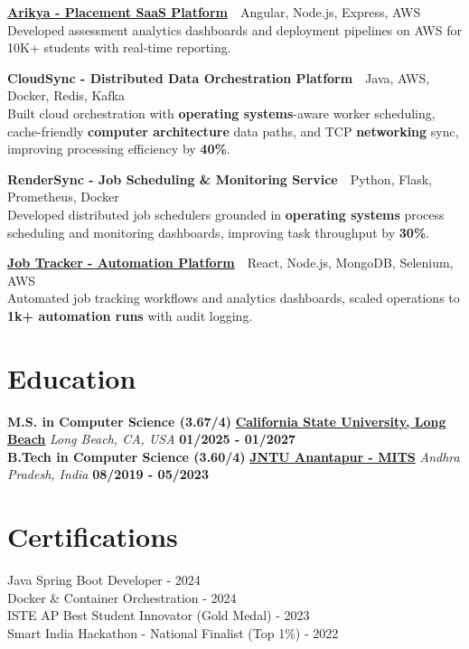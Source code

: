 \documentclass[letterpaper,11pt]{article}
\begin{document}
\vspace{2pt}
\href{https://arikya.in}{\textbf{Arikya - Placement SaaS Platform}} \,\textbar\, {Angular, Node.js, Express, AWS}\\
Developed assessment analytics dashboards and deployment pipelines on AWS for 10K+ students with real-time reporting.

\vspace{2pt}
\textbf{CloudSync - Distributed Data Orchestration Platform} \,\textbar\, {Java, AWS, Docker, Redis, Kafka}\\
Built cloud orchestration with \textbf{operating systems}-aware worker scheduling, cache-friendly \textbf{computer architecture} data paths, and TCP \textbf{networking} sync, improving processing efficiency by \textbf{40\%}.

\vspace{2pt}
\textbf{RenderSync - Job Scheduling \& Monitoring Service} \,\textbar\, {Python, Flask, Prometheus, Docker}\\
Developed distributed job schedulers grounded in \textbf{operating systems} process scheduling and monitoring dashboards, improving task throughput by \textbf{30\%}.

\vspace{2pt}
\href{https://jobtracker.karthikkovi.com}{\textbf{Job Tracker - Automation Platform}} \,\textbar\, {React, Node.js, MongoDB, Selenium, AWS}\\
Automated job tracking workflows and analytics dashboards, scaled operations to \textbf{1k+ automation runs} with audit logging.

\section{\textbf{Education}}
\vspace{2pt}
\textbf{M.S. in Computer Science (3.67/4)} \hfill \uline{\textbf{California State University, Long Beach}} \hfill \textit{Long Beach, CA, USA} \hspace{0.1em} \textbf{01/2025 - 01/2027}\\
\textbf{B.Tech in Computer Science (3.60/4)} \hfill \uline{\textbf{JNTU Anantapur - MITS}} \hfill \textit{Andhra Pradesh, India} \hspace{0.1em} \textbf{08/2019 - 05/2023}

\section{\textbf{Certifications}}
\vspace{2pt}
Java Spring Boot Developer - 2024 \\
Docker \& Container Orchestration - 2024 \\
ISTE AP Best Student Innovator (Gold Medal) - 2023 \\
Smart India Hackathon - National Finalist (Top 1\%) - 2022
\end{document}
